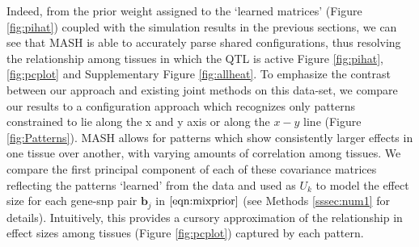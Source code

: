 Indeed, from the prior weight assigned to the `learned matrices' (Figure \ref{fig:pihat}) coupled with the simulation results in the previous sections, we can see that MASH is able to accurately parse shared configurations, thus resolving the relationship among tissues in which the QTL is active Figure \ref{fig:pihat}, \ref{fig:pcplot} and Supplementary Figure \ref{fig:allheat}. 
To emphasize the contrast  between our approach and existing joint methods on this data-set, we compare our results to a configuration approach which recognizes only patterns constrained to lie along the x and y axis or along the $x-y$ line (Figure \ref{fig:Patterns}). MASH allows for patterns which show consistently larger effects in one tissue over another, with varying amounts of correlation among tissues.   We compare the first principal component of each of these covariance matrices reflecting the patterns `learned' from the data and used as $U_{k}$ to model the effect size for each gene-snp pair $\bm{b}_{j}$ in $\ref{eqn:mixprior}$ (see Methods \ref{sssec:num1} for details). Intuitively, this provides a cursory approximation of the relationship in effect sizes among tissues (Figure \ref{fig:pcplot}) captured by each pattern. 


